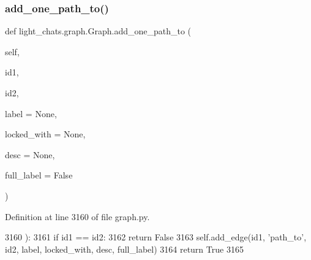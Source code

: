 \mbox{\label{classlight__chats_1_1graph_1_1Graph_ae7da5d306e949414cc4df9d49bc0678d}} 
\subsubsection{\texorpdfstring{add\+\_\+one\+\_\+path\+\_\+to()}{add\_one\_path\_to()}}
{\footnotesize\ttfamily def light\+\_\+chats.\+graph.\+Graph.\+add\+\_\+one\+\_\+path\+\_\+to (\begin{DoxyParamCaption}\item[{}]{self,  }\item[{}]{id1,  }\item[{}]{id2,  }\item[{}]{label = {\ttfamily None},  }\item[{}]{locked\+\_\+with = {\ttfamily None},  }\item[{}]{desc = {\ttfamily None},  }\item[{}]{full\+\_\+label = {\ttfamily False} }\end{DoxyParamCaption})}



Definition at line 3160 of file graph.\+py.


\begin{DoxyCode}
3160     ):
3161         \textcolor{keywordflow}{if} id1 == id2:
3162             \textcolor{keywordflow}{return} \textcolor{keyword}{False}
3163         self.add\_edge(id1, \textcolor{stringliteral}{'path\_to'}, id2, label, locked\_with, desc, full\_label)
3164         \textcolor{keywordflow}{return} \textcolor{keyword}{True}
3165 
\end{DoxyCode}
\mbox{\label{classlight__chats_1_1graph_1_1Graph_a4335de6c1c70dbbab982149a5c1e1586}} 
